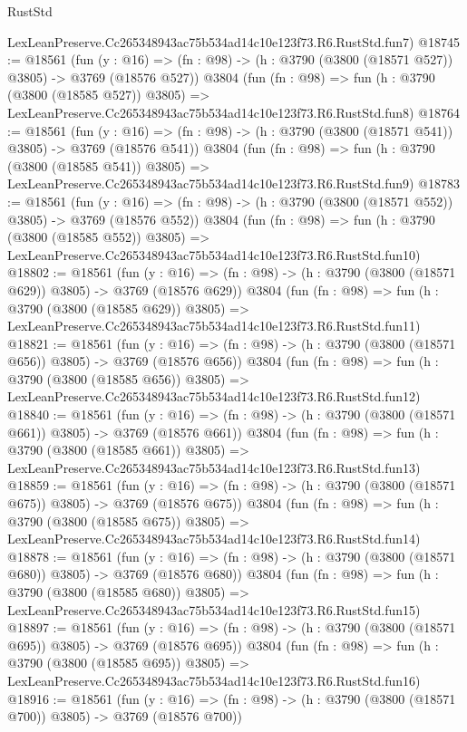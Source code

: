 \begin{lexlean}{RustStd}
\begin{coremodule}
    LexLeanPreserve.Cc265348943ac75b534ad14c10e123f73.R6.RustStd.fun7)
@18745 := @18561
    (fun (y : @16) => (fn : @98) -> (h : @3790 (@3800 (@18571 @527)) @3805) -> @3769 (@18576 @527))
    @3804
    (fun (fn : @98) =>
    fun (h : @3790 (@3800 (@18585 @527)) @3805) =>
    LexLeanPreserve.Cc265348943ac75b534ad14c10e123f73.R6.RustStd.fun8)
@18764 := @18561
    (fun (y : @16) => (fn : @98) -> (h : @3790 (@3800 (@18571 @541)) @3805) -> @3769 (@18576 @541))
    @3804
    (fun (fn : @98) =>
    fun (h : @3790 (@3800 (@18585 @541)) @3805) =>
    LexLeanPreserve.Cc265348943ac75b534ad14c10e123f73.R6.RustStd.fun9)
@18783 := @18561
    (fun (y : @16) => (fn : @98) -> (h : @3790 (@3800 (@18571 @552)) @3805) -> @3769 (@18576 @552))
    @3804
    (fun (fn : @98) =>
    fun (h : @3790 (@3800 (@18585 @552)) @3805) =>
    LexLeanPreserve.Cc265348943ac75b534ad14c10e123f73.R6.RustStd.fun10)
@18802 := @18561
    (fun (y : @16) => (fn : @98) -> (h : @3790 (@3800 (@18571 @629)) @3805) -> @3769 (@18576 @629))
    @3804
    (fun (fn : @98) =>
    fun (h : @3790 (@3800 (@18585 @629)) @3805) =>
    LexLeanPreserve.Cc265348943ac75b534ad14c10e123f73.R6.RustStd.fun11)
@18821 := @18561
    (fun (y : @16) => (fn : @98) -> (h : @3790 (@3800 (@18571 @656)) @3805) -> @3769 (@18576 @656))
    @3804
    (fun (fn : @98) =>
    fun (h : @3790 (@3800 (@18585 @656)) @3805) =>
    LexLeanPreserve.Cc265348943ac75b534ad14c10e123f73.R6.RustStd.fun12)
@18840 := @18561
    (fun (y : @16) => (fn : @98) -> (h : @3790 (@3800 (@18571 @661)) @3805) -> @3769 (@18576 @661))
    @3804
    (fun (fn : @98) =>
    fun (h : @3790 (@3800 (@18585 @661)) @3805) =>
    LexLeanPreserve.Cc265348943ac75b534ad14c10e123f73.R6.RustStd.fun13)
@18859 := @18561
    (fun (y : @16) => (fn : @98) -> (h : @3790 (@3800 (@18571 @675)) @3805) -> @3769 (@18576 @675))
    @3804
    (fun (fn : @98) =>
    fun (h : @3790 (@3800 (@18585 @675)) @3805) =>
    LexLeanPreserve.Cc265348943ac75b534ad14c10e123f73.R6.RustStd.fun14)
@18878 := @18561
    (fun (y : @16) => (fn : @98) -> (h : @3790 (@3800 (@18571 @680)) @3805) -> @3769 (@18576 @680))
    @3804
    (fun (fn : @98) =>
    fun (h : @3790 (@3800 (@18585 @680)) @3805) =>
    LexLeanPreserve.Cc265348943ac75b534ad14c10e123f73.R6.RustStd.fun15)
@18897 := @18561
    (fun (y : @16) => (fn : @98) -> (h : @3790 (@3800 (@18571 @695)) @3805) -> @3769 (@18576 @695))
    @3804
    (fun (fn : @98) =>
    fun (h : @3790 (@3800 (@18585 @695)) @3805) =>
    LexLeanPreserve.Cc265348943ac75b534ad14c10e123f73.R6.RustStd.fun16)
@18916 := @18561
    (fun (y : @16) => (fn : @98) -> (h : @3790 (@3800 (@18571 @700)) @3805) -> @3769 (@18576 @700))

\end{coremodule}
\end{lexlean}
